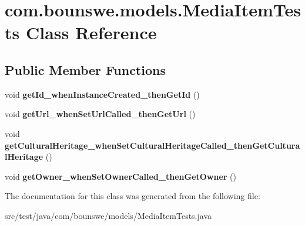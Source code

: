 \hypertarget{classcom_1_1bounswe_1_1models_1_1_media_item_tests}{}\section{com.\+bounswe.\+models.\+Media\+Item\+Tests Class Reference}
\label{classcom_1_1bounswe_1_1models_1_1_media_item_tests}
\subsection*{Public Member Functions}
\begin{DoxyCompactItemize}
\item 
\mbox{\label{classcom_1_1bounswe_1_1models_1_1_media_item_tests_ac837f55ff7f9caa38e53e196b5c73f32}} 
void {\bfseries get\+Id\+\_\+when\+Instance\+Created\+\_\+then\+Get\+Id} ()
\item 
\mbox{\label{classcom_1_1bounswe_1_1models_1_1_media_item_tests_ae6663fed8c78e75f991191e41133f3fb}} 
void {\bfseries get\+Url\+\_\+when\+Set\+Url\+Called\+\_\+then\+Get\+Url} ()
\item 
\mbox{\label{classcom_1_1bounswe_1_1models_1_1_media_item_tests_a8c86c85ff12cf01a81cbc5f277104b1e}} 
void {\bfseries get\+Cultural\+Heritage\+\_\+when\+Set\+Cultural\+Heritage\+Called\+\_\+then\+Get\+Cultural\+Heritage} ()
\item 
\mbox{\label{classcom_1_1bounswe_1_1models_1_1_media_item_tests_a3c18e1f83952099ce3e3ae2d7cb6f889}} 
void {\bfseries get\+Owner\+\_\+when\+Set\+Owner\+Called\+\_\+then\+Get\+Owner} ()
\end{DoxyCompactItemize}


The documentation for this class was generated from the following file\+:\begin{DoxyCompactItemize}
\item 
src/test/java/com/bounswe/models/Media\+Item\+Tests.\+java\end{DoxyCompactItemize}

